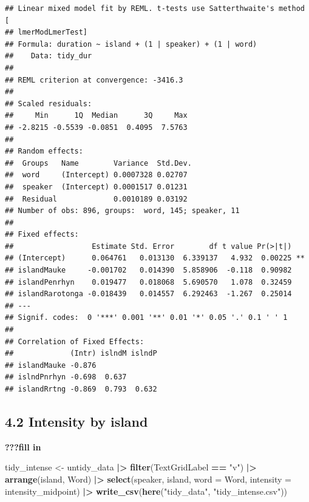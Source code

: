 \documentclass[
  ,man,floatsintext]{apa6}
\newenvironment{Shaded}{\begin{snugshade}}{\end{snugshade}}
\newcommand{\AttributeTok}[1]{\textcolor[rgb]{0.13,0.29,0.53}{#1}}
\newcommand{\FunctionTok}[1]{\textcolor[rgb]{0.13,0.29,0.53}{\textbf{#1}}}
\newcommand{\NormalTok}[1]{#1}
\newcommand{\OtherTok}[1]{\textcolor[rgb]{0.56,0.35,0.01}{#1}}
\newcommand{\SpecialCharTok}[1]{\textcolor[rgb]{0.81,0.36,0.00}{\textbf{#1}}}
\newcommand{\StringTok}[1]{\textcolor[rgb]{0.31,0.60,0.02}{#1}}
\begin{document}
\begin{verbatim}
## Linear mixed model fit by REML. t-tests use Satterthwaite's method [
## lmerModLmerTest]
## Formula: duration ~ island + (1 | speaker) + (1 | word)
##    Data: tidy_dur
## 
## REML criterion at convergence: -3416.3
## 
## Scaled residuals: 
##     Min      1Q  Median      3Q     Max 
## -2.8215 -0.5539 -0.0851  0.4095  7.5763 
## 
## Random effects:
##  Groups   Name        Variance  Std.Dev.
##  word     (Intercept) 0.0007328 0.02707 
##  speaker  (Intercept) 0.0001517 0.01231 
##  Residual             0.0010189 0.03192 
## Number of obs: 896, groups:  word, 145; speaker, 11
## 
## Fixed effects:
##                  Estimate Std. Error        df t value Pr(>|t|)   
## (Intercept)      0.064761   0.013130  6.339137   4.932  0.00225 **
## islandMauke     -0.001702   0.014390  5.858906  -0.118  0.90982   
## islandPenrhyn    0.019477   0.018068  5.690570   1.078  0.32459   
## islandRarotonga -0.018439   0.014557  6.292463  -1.267  0.25014   
## ---
## Signif. codes:  0 '***' 0.001 '**' 0.01 '*' 0.05 '.' 0.1 ' ' 1
## 
## Correlation of Fixed Effects:
##             (Intr) islndM islndP
## islandMauke -0.876              
## islndPnrhyn -0.698  0.637       
## islandRrtng -0.869  0.793  0.632
\end{verbatim}

\subsection{4.2 Intensity by island}\label{intensity-by-island}

\textbf{???fill in}

\begin{Shaded}
\begin{Highlighting}[]
\NormalTok{tidy\_intense }\OtherTok{\textless{}{-}}\NormalTok{ untidy\_data }\SpecialCharTok{|\textgreater{}}
  \FunctionTok{filter}\NormalTok{(TextGridLabel }\SpecialCharTok{==} \StringTok{"v"}\NormalTok{) }\SpecialCharTok{|\textgreater{}}  
  \FunctionTok{arrange}\NormalTok{(island, Word) }\SpecialCharTok{|\textgreater{}}  
  \FunctionTok{select}\NormalTok{(speaker, island, }\AttributeTok{word =}\NormalTok{ Word, }\AttributeTok{intensity =}\NormalTok{ intensity\_midpoint) }\SpecialCharTok{|\textgreater{}}
  \FunctionTok{write\_csv}\NormalTok{(}\FunctionTok{here}\NormalTok{(}\StringTok{"tidy\_data"}\NormalTok{, }\StringTok{"tidy\_intense.csv"}\NormalTok{))}
\end{Highlighting}
\end{Shaded}
\end{document}
